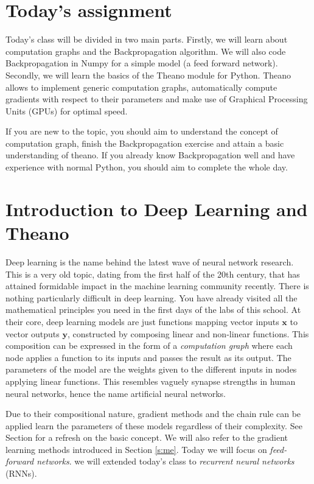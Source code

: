 \section{Today's assignment}
Today's class will be divided in two main parts. Firstly, we will learn about
computation graphs and the Backpropagation algorithm. We will also code
Backpropagation in Numpy for a simple model (a feed forward network). Secondly,
we will learn the basics of the Theano module for Python. Theano allows to
implement  generic computation graphs, automatically compute gradients with
respect to their parameters and make use of Graphical Processing Units (GPUs)
for optimal speed. 

If you are new to the topic, you should aim to understand the concept of computation graph, 
finish the Backpropagation exercise and attain a basic understanding of theano.
If you already know Backpropagation well and have experience with normal
Python, you should aim to complete the whole day. 

\section{Introduction to Deep Learning and Theano}

Deep learning is the name behind the latest wave of neural network research.
This is a very old topic, dating from the first half of the 20th century, that
has attained formidable impact in the machine learning community recently. 
There is nothing particularly difficult in deep learning. You have already
visited all the mathematical principles you need in the first days of the
labs of this school. At their core, deep learning models are just functions
mapping vector inputs $\mathbf{x}$ to vector outputs $\mathbf{y}$, constructed by
composing linear and non-linear functions. This composition can be expressed in
the form of a \textit{computation graph} where each node applies a function to
its inputs and passes the result as its output. The parameters of the model are
the weights given to the different inputs in nodes applying linear
functions. This resembles vaguely synapse strengths in human neural networks,
hence the name artificial neural networks. 

Due to their compositional nature, gradient methods and the chain rule can be
applied learn the parameters of these models regardless of their complexity.
See Section \label{gradient_methods} for a refresh on the basic concept. We
will also refer to the gradient learning methods introduced in Section
\ref{s:me}. Today we will focus on \textit{feed-forward networks}. we will
extended today's class to \textit{recurrent neural networks} (RNNs).  

